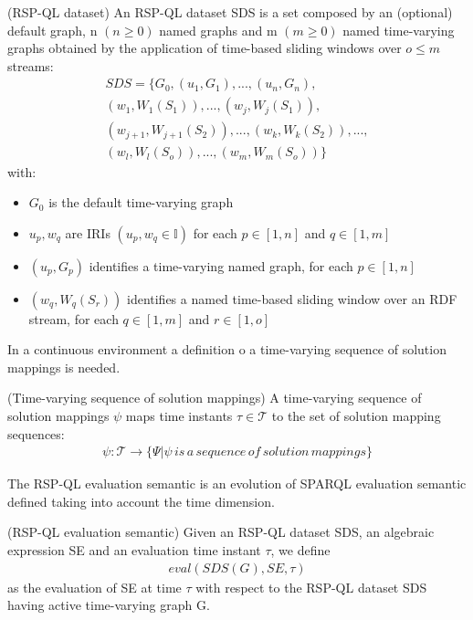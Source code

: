\begin{Definition}
(RSP-QL dataset) An RSP-QL dataset SDS is a set composed by an (optional) default graph, n $(n \geq 0)$ named graphs and m $(m \geq 0)$ named time-varying graphs obtained by the application of time-based sliding windows over $o \leq m$ streams:
\noindent\begin{align*}
SDS =\{G_0, (u_1,G_1), ..., (u_n,G_n),\\
(w_1, W_1(S_1)), ... , (w_j , W_j(S_1)), \\
(w_{j+1}, W_{j+1}(S_2)), ..., (w_k, W_k(S_2)), ..., \\ (w_l,W_l(S_o)), ..., (w_m, W_m(S_o))\}
\end{align*}  
with:
\begin{itemize}
\item $G_0$ is the default time-varying graph
\item $u_p,w_q$ are IRIs $(u_p,w_q \in \mathbb{I})$ for each $p \in [1,n]$ and $q \in [1,m]$
\item $(u_p,G_p)$ identifies a time-varying named
graph, for each $p \in [1, n]$
\item $(w_q , W_q (S_r))$ identifies a named time-based sliding window over an RDF stream, for each $q \in [1, m]$ and $r \in [1, o]$
\end{itemize}
\end{Definition}

In a continuous environment a definition o a time-varying sequence of solution mappings is needed.

\begin{Definition}
(Time-varying sequence of solution mappings)
A time-varying sequence of solution mappings $\psi$ maps time instants $\tau \in \mathcal{T}$ to the set of solution mapping sequences:
\noindent\begin{align*}
\psi : \mathcal{T} \rightarrow \{\Psi | \psi\, is\, a\, sequence\, of\, solution\, mappings\}
\end{align*}  
\end{Definition}

The RSP-QL evaluation semantic is an evolution of SPARQL evaluation semantic defined taking into account the time dimension.

\begin{Definition}
(RSP-QL evaluation semantic)
Given an RSP-QL dataset SDS, an algebraic expression SE and an evaluation time instant $\tau$, we define
\noindent\begin{align*}
eval(SDS(G), SE, \tau)
\end{align*}  
as the evaluation of SE at time $\tau$ with respect to the RSP-QL dataset SDS having active time-varying graph G.
\end{Definition}

